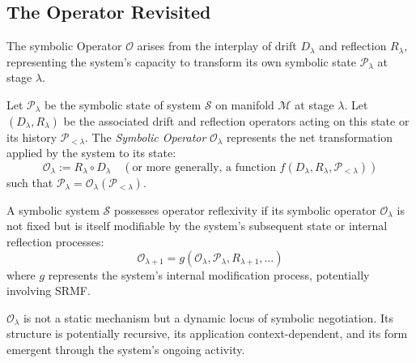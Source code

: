 \subsection{The Operator Revisited}
\label{subsec:bk9_the_operator_revisited}
The symbolic Operator $\mathcal{O}$ arises from the interplay of drift $D_\lambda$ and reflection $R_\lambda$, representing the system's capacity to transform its own symbolic state $\mathcal{P}_\lambda$ at stage $\lambda$.
\begin{definition}
\label{definition:bk9_symbolic_operator}
Let $\mathcal{P}_\lambda$ be the symbolic state of system $\mathcal{S}$ on manifold $\mathcal{M}$ at stage $\lambda$. Let $(D_\lambda, R_\lambda)$ be the associated drift and reflection operators acting on this state or its history $\mathcal{P}_{<\lambda}$. The \emph{Symbolic Operator} $\mathcal{O}_\lambda$ represents the net transformation applied by the system to its state:
\[
\mathcal{O}_\lambda := R_\lambda \circ D_\lambda \quad (\text{or more generally, a function } f(D_\lambda, R_\lambda, \mathcal{P}_{<\lambda}))
\]
such that $\mathcal{P}_\lambda = \mathcal{O}_\lambda(\mathcal{P}_{<\lambda})$.
\end{definition}
\begin{axiom}
\label{axiom:bk9_operator_reflexivity}
A symbolic system $\mathcal{S}$ possesses operator reflexivity if its symbolic operator $\mathcal{O}_\lambda$ is not fixed but is itself modifiable by the system's subsequent state or internal reflection processes:
\[
\mathcal{O}_{\lambda+1} = g(\mathcal{O}_\lambda, \mathcal{P}_\lambda, R_{\lambda+1}, \dots)
\]
where $g$ represents the system's internal modification process, potentially involving SRMF.
\end{axiom}
\begin{remark}
\label{remark:bk9_dynamic_locus}
$\mathcal{O}_\lambda$ is not a static mechanism but a dynamic locus of symbolic negotiation. Its structure is potentially recursive, its application context-dependent, and its form emergent through the system's ongoing activity.
\end{remark}
